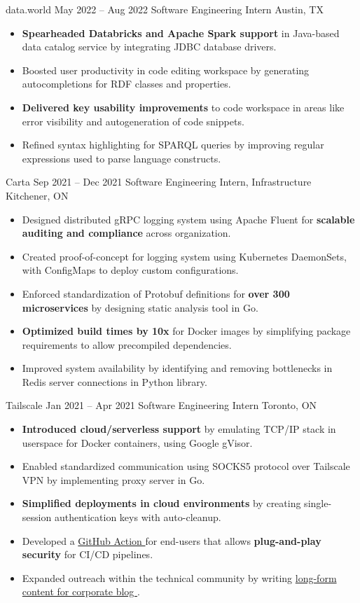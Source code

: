 \documentclass{article}
\begin{document}
\WorkEntry
  {data.world}
  {May 2022 -- Aug 2022}
  {Software Engineering Intern \hfill Austin, TX}
  {
    \begin{itemize} \itemsep -1pt
      \item \textbf{Spearheaded Databricks and Apache Spark support} in Java-based data catalog service by integrating JDBC database drivers.
      \item Boosted user productivity in code editing workspace by generating autocompletions for RDF classes and properties.
      \item \textbf{Delivered key usability improvements} to code workspace in areas like error visibility and autogeneration of code snippets.
      \item Refined syntax highlighting for SPARQL queries by improving regular expressions used to parse language constructs.
    \end{itemize}
  }
\WorkEntry
  {Carta}
  {Sep 2021 -- Dec 2021}
  {Software Engineering Intern, Infrastructure \hfill Kitchener, ON}
  {
    \begin{itemize} \itemsep -1pt
      \item Designed distributed gRPC logging system using Apache Fluent for \textbf{scalable auditing and compliance} across organization.
      \item Created proof-of-concept for logging system using Kubernetes DaemonSets, with ConfigMaps to deploy custom configurations.
      \item Enforced standardization of Protobuf definitions for \textbf{over 300 microservices} by designing static analysis tool in Go.
      \item \textbf{Optimized build times by 10x} for Docker images by simplifying package requirements to allow precompiled dependencies.
      \item Improved system availability by identifying and removing bottlenecks in Redis server connections in Python library.
    \end{itemize}
  }
\WorkEntry
  {Tailscale}
  {Jan 2021 -- Apr 2021}
  {Software Engineering Intern \hfill Toronto, ON}
  {
    \begin{itemize} \itemsep -1pt
      \item \textbf{Introduced cloud/serverless support} by emulating TCP/IP stack in userspace for Docker containers, using Google gVisor.
      \item Enabled standardized communication using SOCKS5 protocol over Tailscale VPN by implementing proxy server in Go.
      \item \textbf{Simplified deployments in cloud environments} by creating single-session authentication keys with auto-cleanup.
      \item Developed a \href{https://github.com/tailscale/github-action}{GitHub Action \linkIcon} for end-users that allows \textbf{plug-and-play security} for CI/CD pipelines.
      \item Expanded outreach within the technical community by writing \href{https://tailscale.com/blog/2021-05-github-actions-and-tailscale/}{long-form content for corporate blog \linkIcon}.
    \end{itemize}
  }
\end{document}
